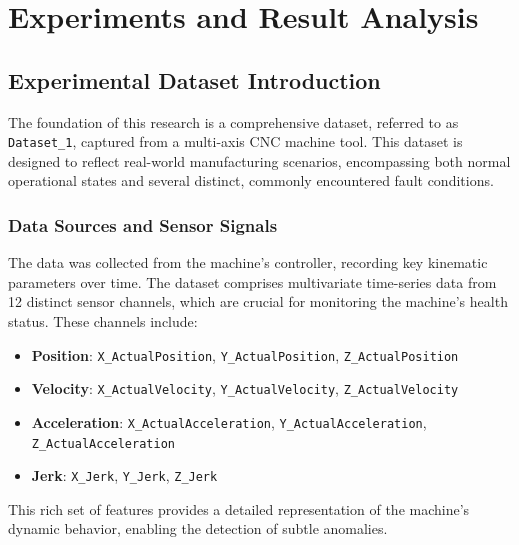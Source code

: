 \chapter{Experiments and Result Analysis}
\label{cha:experiments}

\section{Experimental Dataset Introduction}
\label{sec:experiments:dataset}

The foundation of this research is a comprehensive dataset, referred to as \texttt{Dataset\_1}, captured from a multi-axis CNC machine tool. This dataset is designed to reflect real-world manufacturing scenarios, encompassing both normal operational states and several distinct, commonly encountered fault conditions.

\subsection{Data Sources and Sensor Signals}
The data was collected from the machine's controller, recording key kinematic parameters over time. The dataset comprises multivariate time-series data from 12 distinct sensor channels, which are crucial for monitoring the machine's health status. These channels include:

\begin{itemize}
    \item \textbf{Position}: \texttt{X\_ActualPosition}, \texttt{Y\_ActualPosition}, \texttt{Z\_ActualPosition}
    \item \textbf{Velocity}: \texttt{X\_ActualVelocity}, \texttt{Y\_ActualVelocity}, \texttt{Z\_ActualVelocity}
    \item \textbf{Acceleration}: \texttt{X\_ActualAcceleration}, \texttt{Y\_ActualAcceleration}, \texttt{Z\_ActualAcceleration}
    \item \textbf{Jerk}: \texttt{X\_Jerk}, \texttt{Y\_Jerk}, \texttt{Z\_Jerk}
\end{itemize}

This rich set of features provides a detailed representation of the machine's dynamic behavior, enabling the detection of subtle anomalies.

